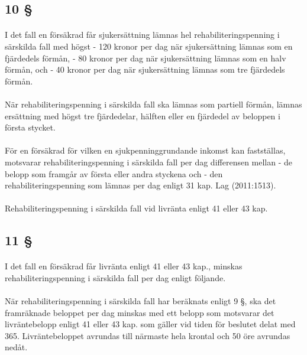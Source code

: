 \documentclass[a4paper,notitlepage,openany,10pt]{book}
\begin{document}
\subsection*{10 §}
\paragraph*{}
I det fall en försäkrad får sjukersättning lämnas hel rehabiliteringspenning i särskilda fall med högst
\newline - 120 kronor per dag när sjukersättning lämnas som en fjärdedels förmån,
\newline - 80 kronor per dag när sjukersättning lämnas som en halv förmån, och
\newline - 40 kronor per dag när sjukersättning lämnas som tre fjärdedels förmån.
\paragraph*{}
När rehabiliteringspenning i särskilda fall ska lämnas som partiell förmån, lämnas ersättning med högst tre fjärdedelar, hälften eller en fjärdedel av beloppen i första stycket.
\paragraph*{}
För en försäkrad för vilken en sjukpenninggrundande inkomst kan fastställas, motsvarar rehabiliteringspenning i särskilda fall per dag differensen mellan
\newline - de belopp som framgår av första eller andra styckena och
\newline - den rehabiliteringspenning som lämnas per dag enligt 31 kap.
Lag (2011:1513).
\paragraph*{}
Rehabiliteringspenning i särskilda fall vid livränta enligt 41 eller 43 kap.
\subsection*{11 §}
\paragraph*{}
I det fall en försäkrad får livränta enligt 41 eller 43 kap., minskas rehabiliteringspenning i särskilda fall per dag enligt följande.
\paragraph*{}
När rehabiliteringspenning i särskilda fall har beräknats enligt 9 §, ska det framräknade beloppet per dag minskas med ett belopp som motsvarar det livräntebelopp enligt 41 eller 43 kap. som gäller vid tiden för beslutet delat med 365.
Livräntebeloppet avrundas till närmaste hela krontal och 50 öre avrundas nedåt.
\end{document}
